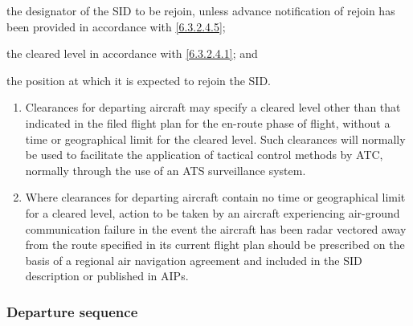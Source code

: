 \begin{enumeratesc}
\begin{enumerate}
        \begin{enumalph}
            \item the designator of the SID to be rejoin, unless advance notification of rejoin has been provided in accordance with \ref{6.3.2.4.5};
            \item the cleared level in accordance with \ref{6.3.2.4.1}; and
            \item the position at which it is expected to rejoin the SID.
        \end{enumalph}
        
        
    \end{enumerate}

    \begin{enumerate}
        \item Clearances for departing aircraft may specify a cleared level other than that indicated in the filed flight plan for the en-route phase of flight, without a time or geographical limit for the cleared level. Such clearances will normally be used to facilitate the application of tactical control methods by ATC, normally through the use of an ATS surveillance system.
        \item Where clearances for departing aircraft contain no time or geographical limit for a cleared level, action to be taken by an aircraft experiencing air-ground communication failure in the event the aircraft has been radar vectored away from the route specified in its current flight plan should be prescribed on the basis of a regional air navigation agreement and included in the SID description or published in AIPs.
    \end{enumerate}
\end{enumeratesc}

\subsubsection{Departure sequence}

